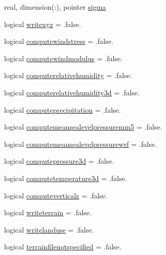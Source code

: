 \begin{DoxyCompactItemize}
\item 
real, dimension(\+:), pointer \mbox{\hyperlink{structmodulewrfformat_1_1t__wrfformat_a7c63bcf8783fd1b1f5f6d781b02cf931}{sigma}}
\item 
logical \mbox{\hyperlink{structmodulewrfformat_1_1t__wrfformat_a49c42dbf67ef7ef2ea562dd4fbb4957b}{writexyz}} = .false.
\item 
logical \mbox{\hyperlink{structmodulewrfformat_1_1t__wrfformat_a00d67fe5e936983c8d27be46c0949343}{computewindstress}} = .false.
\item 
logical \mbox{\hyperlink{structmodulewrfformat_1_1t__wrfformat_a471c454f5aed3bc61178c113e1e4c012}{computewindmodulus}} = .false.
\item 
logical \mbox{\hyperlink{structmodulewrfformat_1_1t__wrfformat_a09c8a11c226d564586515038af70ced3}{computerelativehumidity}} = .false.
\item 
logical \mbox{\hyperlink{structmodulewrfformat_1_1t__wrfformat_a5aec6a96378b105b1004c1ebd622ba0d}{computerelativehumidity3d}} = .false.
\item 
logical \mbox{\hyperlink{structmodulewrfformat_1_1t__wrfformat_af57e5c2e10d266138065c78f6191e9d8}{computeprecipitation}} = .false.
\item 
logical \mbox{\hyperlink{structmodulewrfformat_1_1t__wrfformat_ae065cf89ba35aa083cd71a67493f33f3}{computemeansealevelpressuremm5}} = .false.
\item 
logical \mbox{\hyperlink{structmodulewrfformat_1_1t__wrfformat_a38812591c77672c326740b4d60f4fcb2}{computemeansealevelpressurewrf}} = .false.
\item 
logical \mbox{\hyperlink{structmodulewrfformat_1_1t__wrfformat_a22c3a1c26071c00f9f9727e5ddbc6aa2}{computepressure3d}} = .false.
\item 
logical \mbox{\hyperlink{structmodulewrfformat_1_1t__wrfformat_ae56b4a207699dc6fbbdbc78177e7fc00}{computetemperature3d}} = .false.
\item 
logical \mbox{\hyperlink{structmodulewrfformat_1_1t__wrfformat_ab92cfbd8fdbcb74f20ef61c4c0003c62}{computeverticalz}} = .false.
\item 
logical \mbox{\hyperlink{structmodulewrfformat_1_1t__wrfformat_a614ea3a8053f3cffa6f141f17a6368aa}{writeterrain}} = .false.
\item 
logical \mbox{\hyperlink{structmodulewrfformat_1_1t__wrfformat_a484e6ca0712e991a1d75786d4c0f39f4}{writelanduse}} = .false.
\item 
logical \mbox{\hyperlink{structmodulewrfformat_1_1t__wrfformat_a8a606fb942ea7b85541eadf24fb9f1a3}{terrainfilenotspecified}} = .false.

\end{DoxyCompactItemize}
